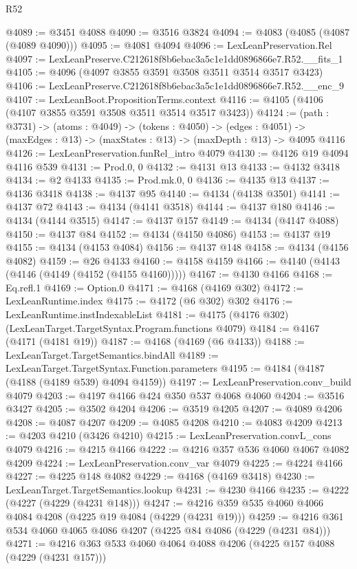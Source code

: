 \begin{lexlean}{R52}
\begin{coremodule}
@4089 := @3451 @4088
@4090 := @3516 @3824
@4094 := @4083 (@4085 (@4087 (@4089 @4090)))
@4095 := @4081 @4094
@4096 := LexLeanPreservation.Rel
@4097 := LexLeanPreserve.C212618f8b6ebac3a5c1e1dd0896866e7.R52.__fits_1
@4105 := @4096 (@4097 @3855 @3591 @3508 @3511 @3514 @3517 @3423)
@4106 := LexLeanPreserve.C212618f8b6ebac3a5c1e1dd0896866e7.R52.__enc_9
@4107 := LexLeanBoot.PropositionTerms.context
@4116 := @4105 (@4106 (@4107 @3855 @3591 @3508 @3511 @3514 @3517 @3423))
@4124 := (path : @3731) ->
  (atoms : @4049) ->
  (tokens : @4050) ->
  (edges : @4051) -> (maxEdges : @13) -> (maxStates : @13) -> (maxDepth : @13) -> @4095 @4116
@4126 := LexLeanPreservation.funRel_intro @4079
@4130 := @4126 @19 @4094 @4116 @539
@4131 := Prod.{0, 0}
@4132 := @4131 @13
@4133 := @4132 @3418
@4134 := @2 @4133
@4135 := Prod.mk.{0, 0}
@4136 := @4135 @13
@4137 := @4136 @3418
@4138 := @4137 @95
@4140 := @4134 (@4138 @3501)
@4141 := @4137 @72
@4143 := @4134 (@4141 @3518)
@4144 := @4137 @180
@4146 := @4134 (@4144 @3515)
@4147 := @4137 @157
@4149 := @4134 (@4147 @4088)
@4150 := @4137 @84
@4152 := @4134 (@4150 @4086)
@4153 := @4137 @19
@4155 := @4134 (@4153 @4084)
@4156 := @4137 @148
@4158 := @4134 (@4156 @4082)
@4159 := @26 @4133
@4160 := @4158 @4159
@4166 := @4140 (@4143 (@4146 (@4149 (@4152 (@4155 @4160)))))
@4167 := @4130 @4166
@4168 := Eq.refl.{1}
@4169 := Option.{0}
@4171 := @4168 (@4169 @302)
@4172 := LexLeanRuntime.index
@4175 := @4172 (@6 @302) @302
@4176 := LexLeanRuntime.instIndexableList
@4181 := @4175 (@4176 @302) (LexLeanTarget.TargetSyntax.Program.functions @4079)
@4184 := @4167 (@4171 (@4181 @19))
@4187 := @4168 (@4169 (@6 @4133))
@4188 := LexLeanTarget.TargetSemantics.bindAll
@4189 := LexLeanTarget.TargetSyntax.Function.parameters
@4195 := @4184 (@4187 (@4188 (@4189 @539) @4094 @4159))
@4197 := LexLeanPreservation.conv_build @4079
@4203 := @4197 @4166 @424 @350 @537 @4068 @4060
@4204 := @3516 @3427
@4205 := @3502 @4204
@4206 := @3519 @4205
@4207 := @4089 @4206
@4208 := @4087 @4207
@4209 := @4085 @4208
@4210 := @4083 @4209
@4213 := @4203 @4210 (@3426 @4210)
@4215 := LexLeanPreservation.convL_cons @4079
@4216 := @4215 @4166
@4222 := @4216 @357 @536 @4060 @4067 @4082 @4209
@4224 := LexLeanPreservation.conv_var @4079
@4225 := @4224 @4166
@4227 := @4225 @148 @4082
@4229 := @4168 (@4169 @3418)
@4230 := LexLeanTarget.TargetSemantics.lookup
@4231 := @4230 @4166
@4235 := @4222 (@4227 (@4229 (@4231 @148)))
@4247 := @4216 @359 @535 @4060 @4066 @4084 @4208 (@4225 @19 @4084 (@4229 (@4231 @19)))
@4259 := @4216 @361 @534 @4060 @4065 @4086 @4207 (@4225 @84 @4086 (@4229 (@4231 @84)))
@4271 := @4216 @363 @533 @4060 @4064 @4088 @4206 (@4225 @157 @4088 (@4229 (@4231 @157)))

\end{coremodule}
\end{lexlean}
